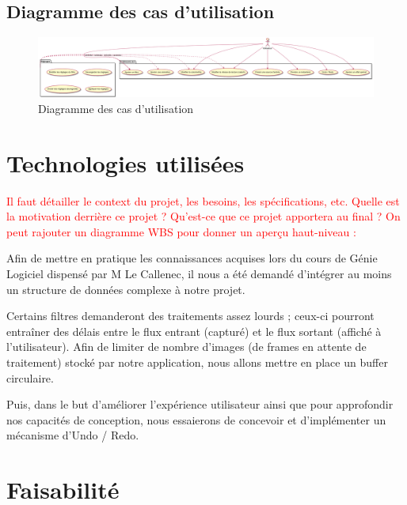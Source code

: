 \begin{landscape}

\section{Diagramme des cas d'utilisation}

\begin{figure}[h]
  \centering
  \includegraphics[width=\textheight]{./images/useCase.png}
  \caption{Diagramme des cas d'utilisation}
  \label{useCase}
\end{figure}

\end{landscape}

\section{Technologies utilisées}

\textcolor{red}
{
Il faut détailler le context du projet, les besoins, les spécifications, etc.
Quelle est la motivation derrière ce projet ?
Qu'est-ce que ce projet apportera au final ?
On peut rajouter un diagramme WBS pour donner un aperçu haut-niveau :
}

Afin de mettre en pratique les connaissances acquises lors du cours de Génie Logiciel dispensé par M Le Callenec,
il nous a été demandé d'intégrer au moins un structure de données complexe à notre projet.

Certains filtres demanderont des traitements assez lourds ; ceux-ci pourront entraîner des délais entre le flux entrant (capturé) et le flux sortant (affiché à l'utilisateur).
Afin de limiter de nombre d'images (de frames en attente de traitement) stocké par notre application, nous allons mettre en place un buffer circulaire.

Puis, dans le but d'améliorer l'expérience utilisateur ainsi que pour approfondir nos capacités de conception, nous essaierons de concevoir et d'implémenter un mécanisme d'Undo / Redo.

\section{Faisabilité}

